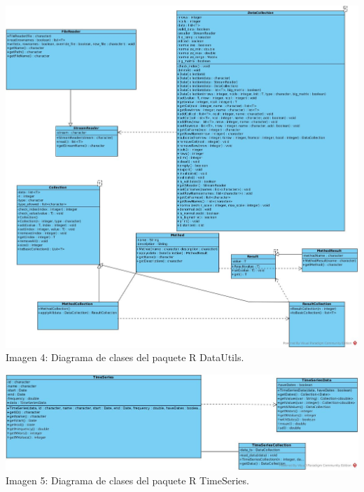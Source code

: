 \documentclass[14pt]{extarticle}
\theoremstyle{definition}
\theoremstyle{remark}
\begin{document}
\begin{landscape}
	\begin{center}
	\includegraphics[scale=0.35]{DataUtilsR.jpg}
	\\Imagen 4: Diagrama de clases del paquete R DataUtils.
	\end{center}
\end{landscape}

\begin{landscape}
	\begin{center}
	\includegraphics[scale=0.5]{TimeSeriesR.jpg}
	\\Imagen 5: Diagrama de clases del paquete R TimeSeries.
	\end{center}
\end{landscape}
\end{document}
